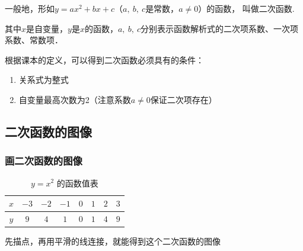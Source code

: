 \documentclass[lang=cn, 10pt, titlestyle=display, oneside]{elegantbook}
\begin{document}
\begin{definition}
一般地，形如\(y=ax^2+bx+c\)（\(a,\ b,\ c\)是常数，\(a\ne0\)）的函数， 叫做二次函数.
\par
其中\(x\)是自变量，\(y\)是\(x\)的函数，\(a,\ b,\ c\)分别表示函数解析式的二次项系数、一次项系数、常数项．
\end{definition}

根据课本的定义，可以得到二次函数必须具有的条件：
\begin{enumerate}
    \item 关系式为整式
    \item 自变量最高次数为2（注意系数\(a\ne0\)保证二次项存在）
\end{enumerate}

\subsection{二次函数的图像}

\subsubsection{画二次函数的图像}
\begin{table}[h]
\centering
\renewcommand{\arraystretch}{1.2} %
\begin{tabular}{|c|*{7}{c|}} \hline
\( x \) & \(-3\) & \(-2\) & \(-1\) & \(0\) & \(1\) & \(2\) & \(3\) \\ \hline\hline
\( y \) & \(9\) & \(4\) & \(1\) & \(0\) & \(1\) & \(4\) & \(9\) \\ \hline
\end{tabular}
\caption{\( y = x^2 \) 的函数值表}
\end{table}

先描点，再用平滑的线连接，就能得到这个二次函数的图像

\begin{figure}[h]
    \centering
    \caption{}
    \label{fuc_1}
\end{figure}
\end{document}
